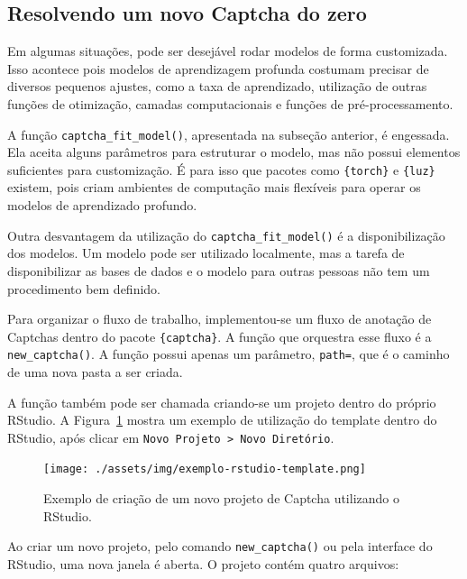 \documentclass[12pt,twoside,brazilian]{book}
\begin{document}
\hypertarget{sec-captcha-do-zero}{%
\subsection{Resolvendo um novo Captcha do
zero}\label{sec-captcha-do-zero}}

Em algumas situações, pode ser desejável rodar modelos de forma
customizada. Isso acontece pois modelos de aprendizagem profunda
costumam precisar de diversos pequenos ajustes, como a taxa de
aprendizado, utilização de outras funções de otimização, camadas
computacionais e funções de pré-processamento.

A função \texttt{captcha\_fit\_model()}, apresentada na subseção
anterior, é engessada. Ela aceita alguns parâmetros para estruturar o
modelo, mas não possui elementos suficientes para customização. É para
isso que pacotes como \texttt{\{torch\}} e \texttt{\{luz\}} existem,
pois criam ambientes de computação mais flexíveis para operar os modelos
de aprendizado profundo.

Outra desvantagem da utilização do \texttt{captcha\_fit\_model()} é a
disponibilização dos modelos. Um modelo pode ser utilizado localmente,
mas a tarefa de disponibilizar as bases de dados e o modelo para outras
pessoas não tem um procedimento bem definido.

Para organizar o fluxo de trabalho, implementou-se um fluxo de anotação
de Captchas dentro do pacote \texttt{\{captcha\}}. A função que
orquestra esse fluxo é a \texttt{new\_captcha()}. A função possui apenas
um parâmetro, \texttt{path=}, que é o caminho de uma nova pasta a ser
criada.

A função também pode ser chamada criando-se um projeto dentro do próprio
RStudio. A Figura~\ref{fig-exemplo-rstudio-template} mostra um exemplo
de utilização do template dentro do RStudio, após clicar em
\texttt{Novo\ Projeto\ \textgreater{}\ Novo\ Diretório}.

\begin{figure}

{\centering \texttt{[image: ./assets/img/exemplo-rstudio-template.png]}

}

\caption{\label{fig-exemplo-rstudio-template}Exemplo de criação de um
novo projeto de Captcha utilizando o RStudio.}

\end{figure}

Ao criar um novo projeto, pelo comando \texttt{new\_captcha()} ou pela
interface do RStudio, uma nova janela é aberta. O projeto contém quatro
arquivos:
\end{document}
